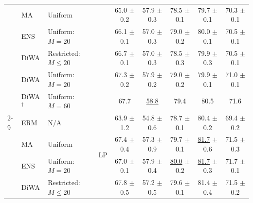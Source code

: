 \begin{table}[h]
{\begin{tabular}{llll|ccccc}
             & MA \cite{arpit2021ensemble}                        & Uniform                   &                                                & 65.0 $\pm$ 0.2             & 57.9 $\pm$ 0.3   & 78.5 $\pm$ 0.1             & 79.7 $\pm$ 0.1             & 70.3 $\pm$ 0.1             \\
             & ENS                                                & Uniform: $M=20$           &                                                & 66.1 $\pm$ 0.1             & 57.0 $\pm$ 0.3   & 79.0 $\pm$ 0.2             & 80.0 $\pm$ 0.1             & 70.5 $\pm$ 0.1             \\
             & DiWA                                               & Restricted: $M \leq 20$   &                                                & 66.7 $\pm$ 0.1             & 57.0 $\pm$ 0.3   & 78.5 $\pm$ 0.3             & 79.9 $\pm$ 0.3             & 70.5 $\pm$ 0.1             \\
             & DiWA                                               & Uniform: $M=20$           &                                                & 67.3 $\pm$ 0.2             & 57.9 $\pm$ 0.2   & 79.0 $\pm$ 0.2             & 79.9 $\pm$ 0.1             & 71.0 $\pm$ 0.1             \\
             & DiWA$^{\dagger}$                                   & Uniform: $M=60$           &                                                & 67.7                       & \underline{58.8} & 79.4                       & 80.5                       & 71.6                       \\
            \cmidrule{2-9}
             & ERM                                                & N/A                       & \multirow{7}{*}{LP \cite{kumar2022finetuning}} & 63.9 $\pm$ 1.2             & 54.8 $\pm$ 0.6   & 78.7 $\pm$ 0.1             & 80.4 $\pm$ 0.2             & 69.4 $\pm$ 0.2             \\
             & MA \cite{arpit2021ensemble}                        & Uniform                   &                                                & 67.4 $\pm$ 0.4             & 57.3 $\pm$ 0.9   & 79.7 $\pm$ 0.1             & \underline{81.7} $\pm$ 0.6 & 71.5 $\pm$ 0.3             \\
             & ENS                                                & Uniform: $M=20$           &                                                & 67.0 $\pm$ 0.1             & 57.9 $\pm$ 0.4   & \underline{80.0} $\pm$ 0.2 & \underline{81.7} $\pm$ 0.3 & 71.7 $\pm$ 0.1             \\
             & DiWA                                               & Restricted: $M \leq 20$   &                                                & 67.8 $\pm$ 0.5             & 57.2 $\pm$ 0.5   & 79.6 $\pm$ 0.1             & 81.4 $\pm$ 0.4             & 71.5 $\pm$ 0.2             \\

\end{tabular}}
\end{table}
